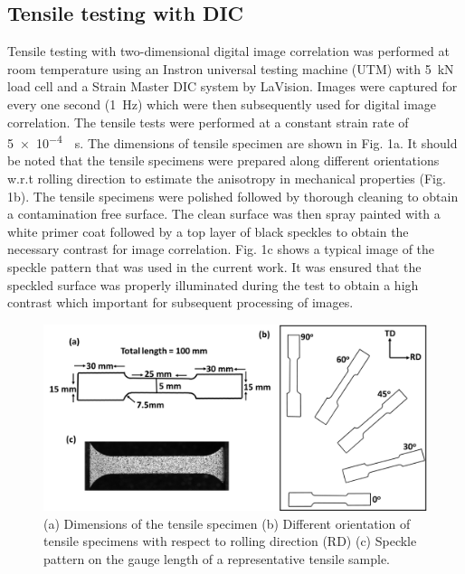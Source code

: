 \documentclass[11pt]{article} %
\begin{document}
\subsection{Tensile testing with DIC}
Tensile testing with two-dimensional digital image correlation was performed at room temperature using an Instron universal testing machine (UTM) with \SI{5}{\kilo\newton} load cell and a Strain Master DIC system by LaVision. Images were captured for every one second (\SI{1}{\hertz}) which were then subsequently used for digital image correlation. The tensile tests were performed at a constant strain rate of \SI{5e-4}{\per\second}. The dimensions of tensile specimen are shown in Fig. 1a. It should be noted that the tensile specimens were prepared along different orientations w.r.t rolling direction to estimate the anisotropy in mechanical properties (Fig. 1b). The tensile specimens were polished followed by thorough cleaning to obtain a contamination free surface. The clean surface was then spray painted with a white primer coat followed by a top layer of black speckles to obtain the necessary contrast for image correlation. Fig. 1c shows a typical image of the speckle pattern that was used in the current work. It was ensured that the speckled surface was properly illuminated during the test to obtain a high contrast which important for subsequent processing of images.

\begin{figure}[h]
	\includegraphics{images/dic_specimens}
	\centering
	\caption{(a) Dimensions of the tensile specimen (b) Different orientation of tensile specimens with respect to rolling direction (RD) (c) Speckle pattern on the gauge length of a representative tensile sample.}
\end{figure}
\end{document}
